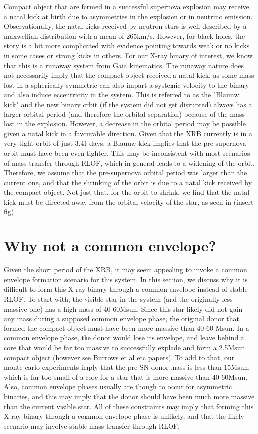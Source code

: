 \documentclass[linenumbers,trackchanges,twocolumn]{aastex701}
\begin{document}
Compact object that are formed in a successful supernova explosion may receive a natal kick at birth due to asymmetries in the explosion or in neutrino emission. Observationally, the natal kicks received by neutron stars is well described by a maxwellian distribution with a mean of 265km/s. However, for black holes, the story is a bit more complicated with evidence pointing towards weak or no kicks in some cases or strong kicks in others. For our X-ray binary of interest, we know that this is a runaway system from Gaia kinematics. The runaway nature does not necessarily imply that the compact object received a natal kick, as some mass lost in a spherically symmetric can also impart a systemic velocity to the binary and also induce eccentricity in the system. This is referred to as the "Blauuw kick" and the new binary orbit (if the system did not get disrupted) always has a larger orbital period (and therefore the orbital separation) because of the mass lost in the explosion. However, a decrease in the orbital period may be possible given a natal kick in a favourable direction. Given that the XRB currently is in a very tight orbit of just 3.41 days, a Blauuw kick implies that the pre-supernova orbit must have been even tighter. This may be inconsistent with most scenarios of mass transfer through RLOF, which in general leads to a widening of the orbit. Therefore, we assume that the pre-supernova orbital period was larger than the current one, and that the shrinking of the orbit is due to a natal kick received by the compact object. Not just that, for the orbit to shrink, we find that the natal kick must be directed away from the orbital velocity of the star, as seen in (insert fig)

\section{Why not a common envelope?}

Given the short period of the XRB, it may seem appealing to invoke a common envelope formation scenario for this system. In this section, we discuss why it is difficult to form this X-ray binary through a common envelope instead of stable RLOF. To start with, the visible star in the system (and the originally less massive one) has a high mass of 40-60Msun. Since this star likely did not gain any mass during a supposed common envelope phase, the original donor that formed the compact object must have been more massive than 40-60 Msun. In a common envelope phase, the donor would lose its envelope, and leave behind a core that would be far too massive to successfully explode and form a 2.5Msun compact object (however see Burrows et al etc papers). To add to that, our monte carlo experiments imply that the pre-SN donor mass is less than 15Msun, which is far too small of a core for a star that is more massive than 40-60Msun. Also, common envelope phases usually are though to occur for asymmetric binaries, and this may imply that the donor should have been much more massive than the current visible star. All of these constraints may imply that forming this X-ray binary through a common envelope phase is unlikely, and that the likely scenario may involve stable mass transfer through RLOF.
\end{document}
